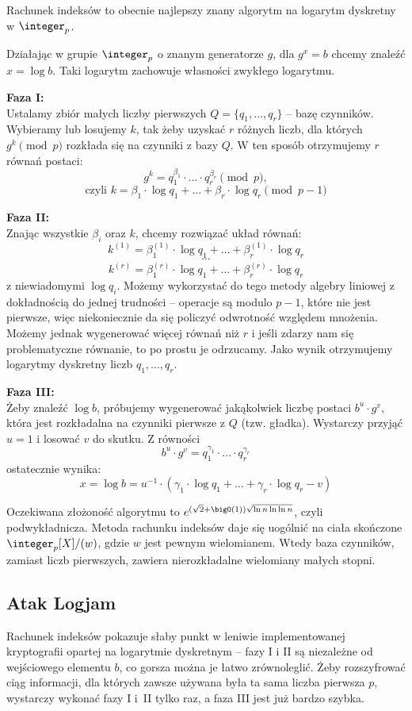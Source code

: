 Rachunek indeksów to obecnie najlepszy znany algorytm na logarytm dyskretny w \( \integer_p \).

Działając w grupie \( \integer_p \) o znanym generatorze \( g \), dla \( g^x = b \) chcemy znaleźć \( x = \log b \). Taki logarytm zachowuje własności zwykłego logarytmu.

\textbf{Faza I:} \\
Ustalamy zbiór małych liczby pierwszych \( Q = \{q_1, \dots, q_r\} \) -- bazę czynników.
Wybieramy lub losujemy \( k \), tak żeby uzyskać \( r \) różnych liczb, dla których \( g^k \pmod{p} \) rozkłada się na czynniki z bazy \( Q \). W ten sposób otrzymujemy \( r \) równań postaci:
\[
	g^k = q_1^{\beta_1} \cdot \ldots \cdot q_r^{\beta_r} \pmod{p},
\]
\[
	\text{czyli } k = \beta_1 \cdot \log q_1 + \ldots + \beta_r \cdot \log q_r \pmod{p - 1}
\]

\textbf{Faza II:} \\
Znając wszystkie \( \beta_i \) oraz \( k \), chcemy rozwiązać układ równań:
\[
	k^{(1)} = \beta_1^{(1)} \cdot \log q_1 + \ldots + \beta_r^{(1)} \cdot \log q_r
\]
\[
	\cdots
\]
\[
	k^{(r)} = \beta_1^{(r)} \cdot \log q_1 + \ldots + \beta_r^{(r)} \cdot \log q_r
\]
z niewiadomymi \( \log q_i \). Możemy wykorzystać do tego metody algebry liniowej z dokładnością do jednej trudności -- operacje są modulo \( p-1 \), które nie jest pierwsze, więc niekoniecznie da się policzyć odwrotność względem mnożenia. Możemy jednak wygenerować więcej równań niż \(r\) i jeśli zdarzy nam się problematyczne równanie, to po prostu je odrzucamy.
Jako wynik otrzymujemy logarytmy dyskretny liczb \( q_1, \dots, q_r \).

\textbf{Faza III:} \\
Żeby znaleźć \( \log b \), próbujemy wygenerować jakąkolwiek liczbę postaci \( b^u \cdot g^v \), która jest rozkładalna na czynniki pierwsze z \(Q\) (tzw. gładka). Wystarczy przyjąć \( u = 1 \) i losować \( v \) do skutku. Z równości
\[ b^u \cdot g^v = q_1^{\gamma_1} \cdot \ldots \cdot q_r^{\gamma_r} \]
ostatecznie wynika:
\[ x = \log b = u^{-1} \cdot (\gamma_1 \cdot \log q_1 + \ldots + \gamma_r \cdot \log q_r - v) \]

Oczekiwana złożoność algorytmu to \( e^{(\sqrt{2}+\bigO(1))\sqrt{\ln n \ln\ln n}} \), czyli podwykładnicza. Metoda rachunku indeksów daje się uogólnić na ciała skończone \( \integer_p[X]/(w) \), gdzie \( w \) jest pewnym wielomianem. Wtedy baza czynników, zamiast liczb pierwszych, zawiera nierozkładalne wielomiany małych stopni.

\subsection{Atak Logjam}
Rachunek indeksów pokazuje słaby punkt w leniwie implementowanej kryptografii opartej na logarytmie dyskretnym -- fazy I i II są niezależne od wejściowego elementu \( b \), co gorsza można je łatwo zrównoleglić. Żeby rozszyfrować ciąg informacji, dla których zawsze używana była ta sama liczba pierwsza \( p \), wystarczy wykonać fazy I i~II tylko raz, a faza III jest już bardzo szybka.
